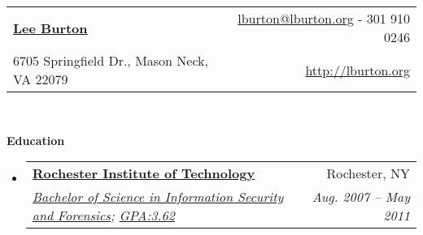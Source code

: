 \documentclass[letterpaper,11pt]{article}
\makeatletter
\newcommand{\resheading}[1]{{\large \colorbox{mygrey}{\begin{minipage}{\textwidth}{\textbf{#1 \vphantom{p\^{E}}}}\end{minipage}}}}
\newcommand{\ressubheading}[4]{
\begin{tabular*}{6.5in}{l@{\extracolsep{\fill}}r}
		\textbf{#1} & #2 \\
		\textit{#3} & \textit{#4} \\
\end{tabular*}\vspace{-6pt}}
\makeatother
\begin{document}
\newcommand{\mywebheader}{
\begin{tabular*}{7in}{l@{\extracolsep{\fill}}r}
	\textbf{\href{http://lburton.org/resume.php}{\LARGE Lee Burton}} & \href{mailto:lburton@lburton.org}{lburton@lburton.org} - 301 910 0246\\
	{\footnotesize 6705 Springfield Dr., Mason Neck, VA 22079} & \href{http://lburton.org}{http://lburton.org} \\
	\end{tabular*}
\\
\vspace{0.1in}}

\mywebheader

\resheading{Education}
	\begin{itemize}
		\item
			\ressubheading{\href{http://www.rit.edu}{Rochester Institute of Technology}}{Rochester, NY}{\href{http://nssa.rit.edu/?q=node/14}{Bachelor of Science in Information Security and Forensics}; \href{http://lburton.org/resume/unofficial-transcript.txt}{GPA:3.62}}{Aug. 2007 -- May 2011}
	\end{itemize} %
\end{document}
